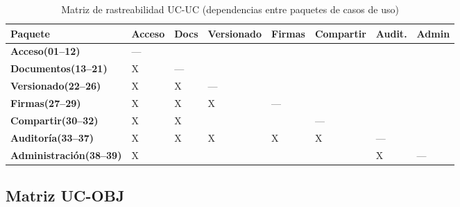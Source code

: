 \documentclass[11pt, a4paper]{article}
\begin{document}
{{\setlength{\tabcolsep}{3pt}
\begin{table}[htbp]
\centering
\footnotesize
\begin{tabular}{|p{3.0cm}|p{1.1cm}|p{1.1cm}|p{1.3cm}|p{1.1cm}|p{1.2cm}|p{1.1cm}|p{1.1cm}|}
\hline
\textbf{Paquete} & \textbf{Acceso} & \textbf{Docs} & \textbf{Versio\-nado} & \textbf{Firmas} & \textbf{Compar\-tir} & \textbf{Audit.} & \textbf{Admin} \\
\hline
\hline
\textbf{Acceso\newline(01--12)} & --- & & & & & & \\
\hline
\textbf{Documentos\newline(13--21)} & X & --- & & & & & \\
\hline
\textbf{Versionado\newline(22--26)} & X & X & --- & & & & \\
\hline
\textbf{Firmas\newline(27--29)} & X & X & X & --- & & & \\
\hline
\textbf{Compartir\newline(30--32)} & X & X & & & --- & & \\
\hline
\textbf{Auditoría\newline(33--37)} & X & X & X & X & X & --- & \\
\hline
\textbf{Administración\newline(38--39)} & X & & & & & X & --- \\
\hline
\end{tabular}
\caption{Matriz de rastreabilidad UC-UC (dependencias entre paquetes de casos de uso)}
\label{tab:matriz-uc-uc}
\end{table}}

\subsection{Matriz UC-OBJ}

}
\end{document}
